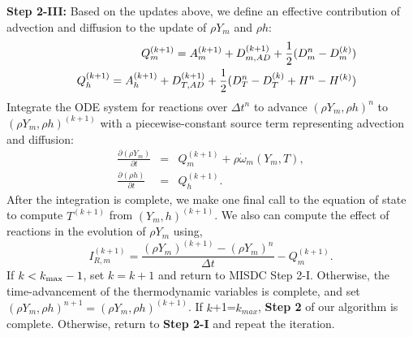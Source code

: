 {\bf Step 2-III:} 
Based on the updates above, we define an effective contribution of advection and diffusion to the
update of $\rho Y_m$ and $\rho h$:
\begin{eqnarray*}
  &&Q_{m}^{(k+1)} = A_m^{(k+1)} + D_{m,AD}^{(k+1)} + \frac{1}{2}(D_m^n - D_m^{(k)}) \\
  &&Q_{h}^{(k+1)} = A_h^{(k+1)} + D_{T,AD}^{(k+1)} + \frac{1}{2}(D_T^n - D_T^{(k)} + H^n - H^{(k)} )
\end{eqnarray*}
Integrate the ODE system for reactions over $\Delta t^n$
to advance $(\rho Y_m,\rho h)^n$ to $(\rho Y_m,\rho h)^{(k+1)}$ with a piecewise-constant source term representing 
advection and diffusion:
\begin{eqnarray}
\frac{\partial(\rho Y_m)}{\partial t} &=& Q_{m}^{(k+1)} + \rho\dot\omega_m(Y_m,T),\label{eq:MISDC VODE 3}\\
\frac{\partial(\rho h)}{\partial t} &=& Q_{h}^{(k+1)}.\label{eq:MISDC VODE 4}
\end{eqnarray}
After the integration is complete, we make one final call to the equation of state
to compute $T^{(k+1)}$ from $(Y_m,h)^{(k+1)}$.  We also can compute the effect of reactions
in the evolution of $\rho Y_m$ using,
\begin{equation}
I_{R,m}^{(k+1)} = \frac{(\rho Y_m)^{(k+1)} - (\rho Y_m)^n}{\Delta t} - Q_{m}^{(k+1)}.
\end{equation}
If $k<k_{\rm max}-1$, set $k=k+1$ and return to MISDC Step 2-I.  Otherwise, the 
time-advancement of the thermodynamic variables is complete, and set 
$(\rho Y_m,\rho h)^{n+1} = (\rho Y_m,\rho h)^{(k+1)}$.
If $k$+1=$k_{max}$, {\bf Step 2} of our algorithm is complete.  Otherwise, return to {\bf Step 2-I} and repeat
 the iteration.
